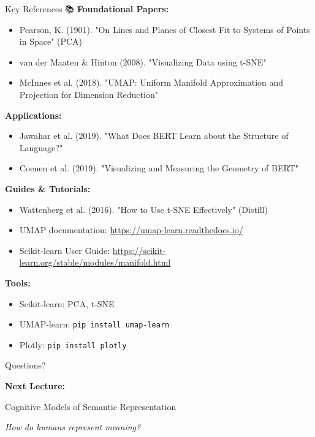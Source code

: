 \documentclass[aspectratio=169]{beamer}
\begin{document}
\begin{frame}[shrink=10]{Key References 📚}
\small
\textbf{Foundational Papers:}
\begin{itemize}\setlength{\itemsep}{0pt}
    \item Pearson, K. (1901). "On Lines and Planes of Closest Fit to Systems of Points in Space" (PCA)
    \item van der Maaten \& Hinton (2008). "Visualizing Data using t-SNE"
    \item McInnes et al. (2018). "UMAP: Uniform Manifold Approximation and Projection for Dimension Reduction"
\end{itemize}

\vspace{0.5em}
\textbf{Applications:}
\begin{itemize}\setlength{\itemsep}{0pt}
    \item Jawahar et al. (2019). "What Does BERT Learn about the Structure of Language?"
    \item Coenen et al. (2019). "Visualizing and Measuring the Geometry of BERT"
\end{itemize}

\vspace{0.5em}
\textbf{Guides \& Tutorials:}
\begin{itemize}\setlength{\itemsep}{0pt}
    \item Wattenberg et al. (2016). "How to Use t-SNE Effectively" (Distill)
    \item UMAP documentation: \url{https://umap-learn.readthedocs.io/}
    \item Scikit-learn User Guide: \url{https://scikit-learn.org/stable/modules/manifold.html}
\end{itemize}

\vspace{0.5em}
\textbf{Tools:}
\begin{itemize}\setlength{\itemsep}{0pt}
    \item Scikit-learn: PCA, t-SNE
    \item UMAP-learn: \texttt{pip install umap-learn}
    \item Plotly: \texttt{pip install plotly}
\end{itemize}
\end{frame}

\begin{frame}{Questions? 🙋}
\begin{center}
\LARGE
\textbf{Next Lecture:}

\vspace{1em}
Cognitive Models of Semantic Representation

\vspace{1em}
\textit{How do humans represent meaning?}
\end{center}
\end{frame}
\end{document}
